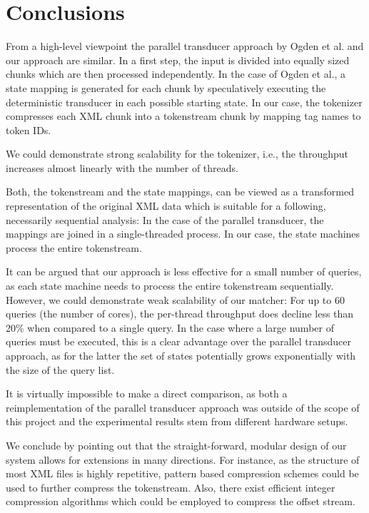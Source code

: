 \section{Conclusions}

From a high-level viewpoint the parallel transducer approach by Ogden et 
al.\cite{Ogden2013} and our approach are similar. In a first step, the input is
divided into equally sized chunks which are then processed independently. In the
case of Ogden et al., a state mapping is generated for each chunk by speculatively
executing the deterministic transducer in each possible starting state. In our case, 
the tokenizer compresses each XML chunk into a tokenstream chunk by mapping 
tag names to token IDs.

We could demonstrate strong scalability for the tokenizer, i.e., the throughput
increases almost linearly with the number of threads.

Both, the tokenstream and the state mappings, can be viewed as a transformed
representation of the original XML data which is suitable for a following,
necessarily sequential analysis: In the case of the parallel transducer, the
mappings are joined in a single-threaded process. In our case, the state
machines process the entire tokenstream.

It can be argued that our approach is less effective for a small number of
queries, as each state machine needs to process the entire tokenstream
sequentially. However, we could demonstrate weak scalability of our matcher:
For up to 60 queries (the number of cores), the per-thread throughput does
decline less than 20\% when compared to a single query. In the case where
a large number of queries must be executed, this is a clear advantage over the
parallel transducer approach, as for the latter the set of states potentially
grows exponentially with the size of the query list.

It is virtually impossible to make a direct comparison, as both a reimplementation 
of the parallel transducer approach was outside of the scope of this project and 
the experimental results stem from different hardware setups.

We conclude by pointing out that the straight-forward, modular design of our
system allows for extensions in many directions. For instance, as the structure
of most XML files is highly repetitive, pattern based compression schemes could
be used to further compress the tokenstream. Also, there exist efficient integer
compression algorithms which could be employed to compress the offset stream.
